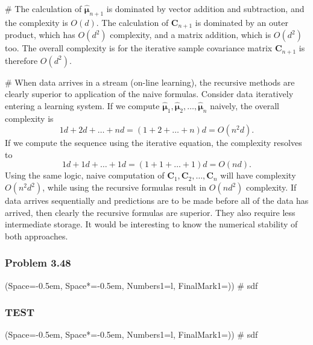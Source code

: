 \documentclass[12pt, a4paper]{article}
\newcommand{\listSpace}{-0.5em}%
\newcommand{\vect}[1]{\bm{#1}}
\begin{document}
\begin{easylist}[enumerate]
# The calculation of $\hat{\vect{\mu}}_{n+1}$ is dominated by vector addition and subtraction, and the complexity is $O(d)$.
The calculation of $\vect{C}_{n+1}$ is dominated by an outer product, which has $O(d^2)$ complexity, and a matrix addition, which is $O(d^2)$ too.
The overall complexity is for the iterative sample covariance matrix $\vect{C}_{n+1}$ is therefore $O(d^2)$.

# When data arrives in a stream (on-line learning), the recursive methods are clearly superior to  application of the naive formulas.
Consider data iteratively entering a learning system.
If we compute $\hat{\vect{\mu}}_{1}, \hat{\vect{\mu}}_{2}, \dots, \hat{\vect{\mu}}_{n}$ naively, the overall complexity is
\begin{equation*}
	1d + 2d + \dots + nd = \left(1 + 2 + \dots + n\right) d = O(n^2 d).
\end{equation*}
If we compute the sequence using the iterative equation, the complexity resolves to
\begin{equation*}
1d + 1d + \dots + 1d = \left(1 + 1 + \dots + 1\right) d = O(n d).
\end{equation*}
Using the same logic, naive computation of $\vect{C}_{1}, \vect{C}_{2}, \dots, \vect{C}_{n}$ will have complexity $O(n^2 d^2)$, while using the recursive formulas result in $O(nd^2)$ complexity. 
If data arrives sequentially and predictions are to be made before all of the data has arrived, then clearly the recursive formulas are superior.
They also require less intermediate storage.
It would be interesting to know the numerical stability of both approaches.

\end{easylist}

\subsubsection*{Problem 3.48}
\begin{easylist}[enumerate]
	\ListProperties(Space=\listSpace, Space*=\listSpace, Numbers1=l, FinalMark1={)})
	# sdf
\end{easylist}




\subsubsection*{TEST}
\begin{easylist}[enumerate]
\ListProperties(Space=\listSpace, Space*=\listSpace, Numbers1=l, FinalMark1={)})
# sdf
\end{easylist}
\end{document}
